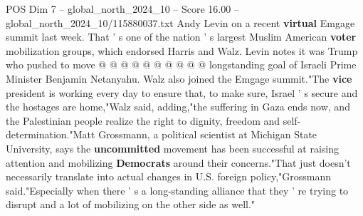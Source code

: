 \begin{textsample}{POS Dim 7 – global\_north\_2024\_10 – Score 16.00 – global\_north\_2024\_10/115880037.txt}
Andy Levin on a recent \textbf{virtual} Emgage summit last week.
That ' s one of the nation ' s largest Muslim American \textbf{voter} mobilization groups, which endorsed Harris and Walz.
Levin notes it was Trump who pushed to move @ @ @ @ @ @ @ @ @ @ longstanding goal of Israeli Prime Minister Benjamin Netanyahu.
Walz also joined the Emgage summit."The \textbf{vice} president is working every day to ensure that, to make sure, Israel ' s secure and the hostages are home,"Walz said, adding,"the suffering in Gaza ends now, and the Palestinian people realize the right to dignity, freedom and self-determination."Matt Grossmann, a political scientist at Michigan State University, says the \textbf{uncommitted} movement has been successful at raising attention and mobilizing \textbf{Democrats} around their concerns."That just doesn't necessarily translate into actual changes in U.S. foreign policy,"Grossmann said."Especially when there ' s a long-standing alliance that they ' re trying to disrupt and a lot of mobilizing on the other side as well."

\end{textsample}

